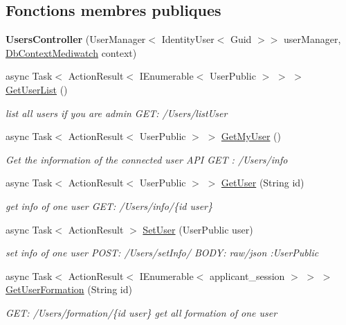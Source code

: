 \subsection*{Fonctions membres publiques}
\begin{DoxyCompactItemize}
\item 
\mbox{\label{class_mediwatch_1_1_server_1_1_controllers_1_1_users_controller_a7957039d9c7d38f0e6791f04e0dcde1e}} 
{\bfseries Users\+Controller} (User\+Manager$<$ Identity\+User$<$ Guid $>$$>$ user\+Manager, \hyperlink{class_server_1_1_db_context_mediwatch}{Db\+Context\+Mediwatch} context)
\item 
async Task$<$ Action\+Result$<$ I\+Enumerable$<$ User\+Public $>$ $>$ $>$ \hyperlink{class_mediwatch_1_1_server_1_1_controllers_1_1_users_controller_a5b525adc63d36869bde5021b82480228}{Get\+User\+List} ()
\begin{DoxyCompactList}\small\item\em list all users if you are admin G\+ET\+: /\+Users/list\+User \end{DoxyCompactList}\item 
async Task$<$ Action\+Result$<$ User\+Public $>$ $>$ \hyperlink{class_mediwatch_1_1_server_1_1_controllers_1_1_users_controller_a9a705b16c851ce5bb20f426b6e923799}{Get\+My\+User} ()
\begin{DoxyCompactList}\small\item\em Get the information of the connected user A\+PI G\+ET \+: /\+Users/info \end{DoxyCompactList}\item 
async Task$<$ Action\+Result$<$ User\+Public $>$ $>$ \hyperlink{class_mediwatch_1_1_server_1_1_controllers_1_1_users_controller_a27103389ca1c6c33d21a3dc3212d7b08}{Get\+User} (String id)
\begin{DoxyCompactList}\small\item\em get info of one user G\+ET\+: /\+Users/info/\{id user\} \end{DoxyCompactList}\item 
async Task$<$ Action\+Result $>$ \hyperlink{class_mediwatch_1_1_server_1_1_controllers_1_1_users_controller_a414ca2854bf71701319b3c34dbda03ab}{Set\+User} (User\+Public user)
\begin{DoxyCompactList}\small\item\em set info of one user P\+O\+ST\+: /\+Users/set\+Info/ B\+O\+DY\+: raw/json \+:User\+Public \end{DoxyCompactList}\item 
async Task$<$ Action\+Result$<$ I\+Enumerable$<$ applicant\+\_\+session $>$ $>$ $>$ \hyperlink{class_mediwatch_1_1_server_1_1_controllers_1_1_users_controller_a3da0476c39418727064b44af9e007010}{Get\+User\+Formation} (String id)
\begin{DoxyCompactList}\small\item\em G\+ET\+: /\+Users/formation/\{id user\} get all formation of one user \end{DoxyCompactList}\end{DoxyCompactItemize}


